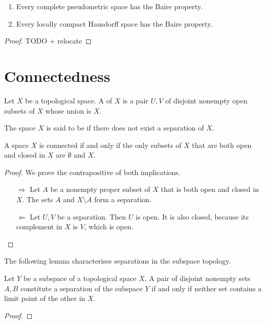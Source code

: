 \begin{theorem} \label{BaireCategory} \hspace{1em}
\begin{enumerate}
\item Every complete pseudometric space has the Baire property.
\item Every locally compact Hausdorff space has the Baire property.
\end{enumerate}
\end{theorem}
\begin{proof}
TODO + relocate
\end{proof}

\section{Connectedness}
\begin{definition}
Let $X$ be a topological space. A  of $X$ is a pair $U,V$ of disjoint nonempty open subsets of $X$ whose union is $X$.

The space $X$ is said to be  if there does not exist a separation of $X$.
\end{definition}
\begin{lemma}
A space $X$ is connected \textup{if and only if} the only subsets of $X$ that are both open and closed in $X$ are $\emptyset$ and $X$.
\end{lemma}
\begin{proof}
We prove the contrapositive of both implications.
\begin{itemize}
\item[$\boxed{\Rightarrow}$] Let $A$ be a nonempty proper subset of $X$ that is both open and closed in $X$. The sets $A$ and $X\setminus A$ form a separation.
\item[$\boxed{\Leftarrow}$] Let $U,V$ be a separation. Then $U$ is open. It is also closed, because its complement in $X$ is $V$, which is open.
\end{itemize}
\end{proof}
The following lemma characterises separations in the subspace topology.
\begin{lemma}
Let $Y$ be a subspace of a topological space $X$. A pair of disjoint nonempty sets $A,B$ constitute a separation of the subspace $Y$ \textup{if and only if} neither set contains a limit point of the other in $X$.
\end{lemma}
\begin{proof}

\end{proof}

